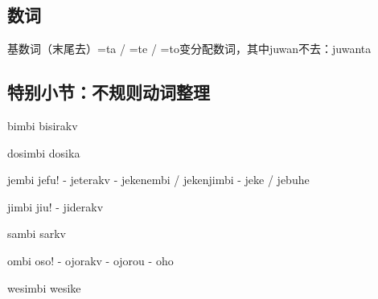 \subsection{数词}
基数词（末尾去）=ta / =te / =to变分配数词，其中juwan不去：juwanta

\subsection{特别小节：不规则动词整理}

\begin{des}
    \item[bimbi] bisirakv 
    \item[dosimbi] dosika 
    \item[jembi] jefu! - jeterakv - jekenembi / jekenjimbi - jeke / jebuhe
    \item[jimbi] jiu! - jiderakv
    \item[sambi] sarkv 
    \item[ombi] oso! - ojorakv - ojorou - oho
    \item[wesimbi] wesike 
\end{des}

